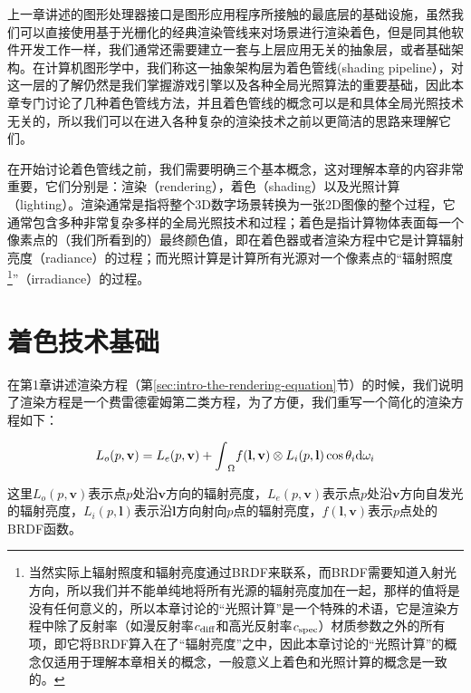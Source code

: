 上一章讲述的图形处理器接口是图形应用程序所接触的最底层的基础设施，虽然我们可以直接使用基于光栅化的经典渲染管线来对场景进行渲染着色，但是同其他软件开发工作一样，我们通常还需要建立一套与上层应用无关的抽象层，或者基础架构。在计算机图形学中，我们称这一抽象架构层为着色管线(shading pipeline），对这一层的了解仍然是我们掌握游戏引擎以及各种全局光照算法的重要基础，因此本章专门讨论了几种着色管线方法，并且着色管线的概念可以是和具体全局光照技术无关的，所以我们可以在进入各种复杂的渲染技术之前以更简洁的思路来理解它们。

在开始讨论着色管线之前，我们需要明确三个基本概念，这对理解本章的内容非常重要，它们分别是：渲染（rendering），着色（shading）以及光照计算（lighting）。渲染通常是指将整个3D数字场景转换为一张2D图像的整个过程，它通常包含多种非常复杂多样的全局光照技术和过程；着色是指计算物体表面每一个像素点的（我们所看到的）最终颜色值，即在着色器或者渲染方程中它是计算辐射亮度（radiance）的过程；而光照计算是计算所有光源对一个像素点的“辐射照度\footnote{当然实际上辐射照度和辐射亮度通过BRDF来联系，而BRDF需要知道入射光方向，所以我们并不能单纯地将所有光源的辐射亮度加在一起，那样的值将是没有任何意义的，所以本章讨论的“光照计算”是一个特殊的术语，它是渲染方程中除了反射率（如漫反射率$c_{\rm diff}$和高光反射率$c_{\rm spec}$）材质参数之外的所有项，即它将BRDF算入在了“辐射亮度”之中，因此本章讨论的“光照计算”的概念仅适用于理解本章相关的概念，一般意义上着色和光照计算的概念是一致的。}”（irradiance）的过程。



\section{着色技术基础}
在第1章讲述渲染方程（第\ref{sec:intro-the-rendering-equation}节）的时候，我们说明了渲染方程是一个费雷德霍姆第二类方程，为了方便，我们重写一个简化的渲染方程如下：

\begin{equation}\label{eq:shade-rendering-equation}
	L_o(p,\mathbf{v})=L_e(p,\mathbf{v})+{\rm \int}_\Omega f(\mathbf{l},\mathbf{v})\otimes L_i(p,\mathbf{l})\cos{\theta_i}{\rm d}\omega_i
\end{equation}

这里$L_o(p,\mathbf{v})$表示点$p$处沿$\mathbf{v}$方向的辐射亮度，$L_e(p,\mathbf{v})$表示点$p$处沿$\mathbf{v}$方向自发光的辐射亮度，$L_i(p,\mathbf{l})$表示沿$\mathbf{l}$方向射向$p$点的辐射亮度，$f(\mathbf{l},\mathbf{v})$表示$p$点处的BRDF函数。

